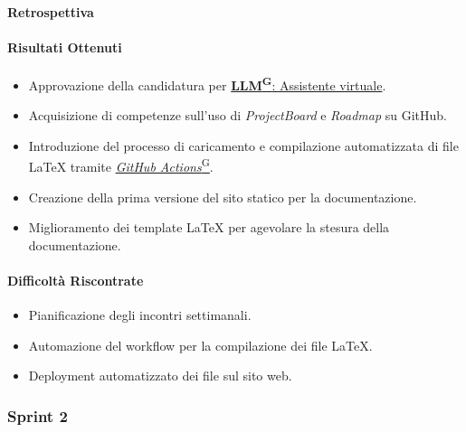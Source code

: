 \documentclass{article}
\begin{document}
                \paragraph{Retrospettiva}
                \paragraph{Risultati Ottenuti}
                    \begin{itemize}
                        \item Approvazione della candidatura per \href{https://code7crusaders.github.io/docs/PB/documentazione_interna/glossario.html#llm-large-language-model}{\textbf{LLM\textsuperscript{G}}: Assistente virtuale}.
                        \item Acquisizione di competenze sull'uso di \emph{ProjectBoard} e \emph{Roadmap} su GitHub.
                        \item Introduzione del processo di caricamento e compilazione automatizzata di file LaTeX tramite \href{https://code7crusaders.github.io/docs/PB/documentazione_interna/glossario.html#github-actions}{\emph{GitHub Actions}\textsuperscript{G}}.
                        \item Creazione della prima versione del sito statico per la documentazione.
                        \item Miglioramento dei template LaTeX per agevolare la stesura della documentazione.
                    \end{itemize}

                    \paragraph{Difficoltà Riscontrate}
                    \begin{itemize}
                        \item Pianificazione degli incontri settimanali.
                        \item Automazione del workflow per la compilazione dei file LaTeX.
                        \item Deployment automatizzato dei file sul sito web.
                    \end{itemize}
            \subsubsection{Sprint 2}
\end{document}
